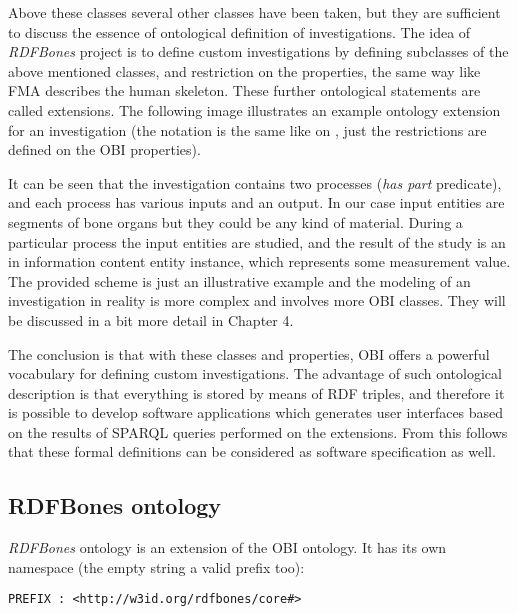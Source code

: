 Above these classes several other classes have been taken, but they are sufficient to discuss the essence of ontological definition of investigations. The idea of \textit{RDFBones} project is to define custom investigations by defining subclasses of the above mentioned classes, and restriction on the properties, the same way like FMA describes the human skeleton. These further ontological statements are called extensions. The following image illustrates an example ontology extension for an investigation (the notation is the same like on , just the restrictions are defined on the OBI properties). 


It can be seen that the investigation contains two processes (\textit{has part} predicate), and each process has various inputs and an output. In our case input entities are segments of bone organs but they could be any kind of material. During a particular process the input entities are studied, and the result of the study is an in information content entity instance, which represents some measurement value. The provided scheme is just an illustrative example and the modeling of an investigation in reality is more complex and involves more OBI classes. They will be discussed in a bit more detail in Chapter 4.

The conclusion is that with these classes and properties, OBI offers a powerful vocabulary for defining custom investigations. The advantage of such ontological description is that everything is stored by means of RDF triples, and therefore it is possible to develop software applications which generates user interfaces based on the results of SPARQL queries performed on the extensions. From this follows that these formal definitions can be considered as software specification as well.

\subsection{RDFBones ontology}

\textit{RDFBones} ontology is an extension of the OBI ontology. It has its own namespace (the empty string a valid prefix too): 

\begin{lstlisting}[basicstyle=\footnotesize, captionpos=b, caption=RDFBones namespace, label=lst:sparql, belowskip=1em, aboveskip=2em,
frame=single]
PREFIX : <http://w3id.org/rdfbones/core#>
\end{lstlisting}

